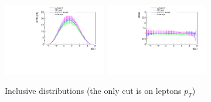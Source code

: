 \begin{figure}[h!]
\includegraphics[width=0.4\textwidth]{figures/etal_inc.pdf}
\includegraphics[width=0.4\textwidth]{figures/Ratioetal_inc.pdf}
\caption{Inclusive distributions (the only cut is on leptons $p_T$)}
\label{fig:inc}
\end{figure}

